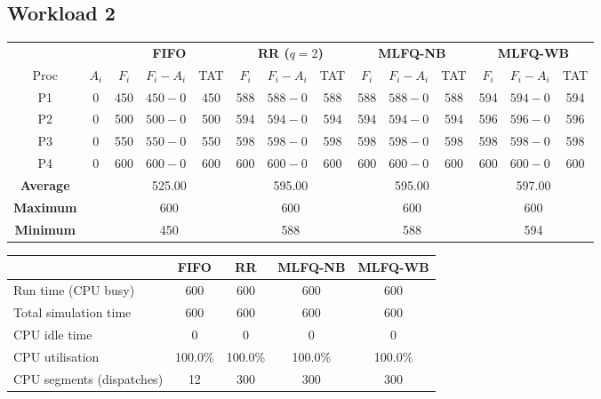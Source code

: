 \documentclass[11pt,a4paper]{article}
\begin{document}
\subsection{Workload 2}
\begin{center}\footnotesize\setlength{\tabcolsep}{4pt}
\begin{tabular}{cccccccccccccc}\toprule
& & \multicolumn{3}{c}{\textbf{FIFO}} & \multicolumn{3}{c}{\textbf{RR ($q=2$)}} & \multicolumn{3}{c}{\textbf{MLFQ-NB}} & \multicolumn{3}{c}{\textbf{MLFQ-WB}} \\
\cmidrule(lr){3-5}\cmidrule(lr){6-8}\cmidrule(lr){9-11}\cmidrule(lr){12-14}
Proc & $A_i$ & $F_i$ & $F_i-A_i$ & TAT & $F_i$ & $F_i-A_i$ & TAT & $F_i$ & $F_i-A_i$ & TAT & $F_i$ & $F_i-A_i$ & TAT \\\midrule
P1 & 0 & 450 & $450-0$ & 450 & 588 & $588-0$ & 588 & 588 & $588-0$ & 588 & 594 & $594-0$ & 594 \\
P2 & 0 & 500 & $500-0$ & 500 & 594 & $594-0$ & 594 & 594 & $594-0$ & 594 & 596 & $596-0$ & 596 \\
P3 & 0 & 550 & $550-0$ & 550 & 598 & $598-0$ & 598 & 598 & $598-0$ & 598 & 598 & $598-0$ & 598 \\
P4 & 0 & 600 & $600-0$ & 600 & 600 & $600-0$ & 600 & 600 & $600-0$ & 600 & 600 & $600-0$ & 600 \\
\midrule
\textbf{Average} & & \multicolumn{3}{c}{525.00} & \multicolumn{3}{c}{595.00} & \multicolumn{3}{c}{595.00} & \multicolumn{3}{c}{597.00} \\
\textbf{Maximum} & & \multicolumn{3}{c}{600} & \multicolumn{3}{c}{600} & \multicolumn{3}{c}{600} & \multicolumn{3}{c}{600} \\
\textbf{Minimum} & & \multicolumn{3}{c}{450} & \multicolumn{3}{c}{588} & \multicolumn{3}{c}{588} & \multicolumn{3}{c}{594} \\
\bottomrule\end{tabular}\end{center}
\begin{center}\footnotesize\begin{tabular}{lcccc}\toprule
& \textbf{FIFO} & \textbf{RR} & \textbf{MLFQ-NB} & \textbf{MLFQ-WB}\\\midrule
Run time (CPU busy) & 600 & 600 & 600 & 600 \\
Total simulation time & 600 & 600 & 600 & 600 \\
CPU idle time & 0 & 0 & 0 & 0 \\
CPU utilisation & 100.0\% & 100.0\% & 100.0\% & 100.0\% \\
CPU segments (dispatches) & 12 & 300 & 300 & 300 \\
\bottomrule\end{tabular}\end{center}
\end{document}
